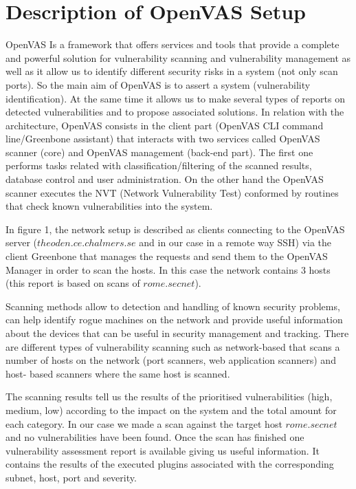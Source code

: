 \section{Description of OpenVAS Setup} \label{sec:setup}

OpenVAS Is a framework that offers services and tools that provide a complete and powerful solution for vulnerability scanning and vulnerability management as well as it allow us to identify different security risks in a system (not only scan ports). So the main aim of OpenVAS is to assert a system (vulnerability identification). At the same time it allows us to make several types of reports on detected vulnerabilities and to propose associated solutions. In relation with the architecture, OpenVAS consists in the client part (OpenVAS CLI command line/Greenbone assistant) that interacts with two services called OpenVAS scanner (core) and OpenVAS management (back-end part). The first one performs tasks related with classification/filtering of the scanned results, database control and user administration. On the other hand the OpenVAS scanner executes the NVT (Network Vulnerability Test) conformed by routines that check known vulnerabilities into the system.

In figure 1, the network setup is described as clients connecting to the OpenVAS server ($theoden.ce.chalmers.se$ and in our case in a remote way SSH) via the client Greenbone that manages the  requests and send them to the OpenVAS Manager in order to scan the hosts. In this case the network contains 3 hosts (this report is based on scans of $rome.secnet$).

Scanning methods allow to detection and handling of known security problems, can help identify rogue machines on the network and provide useful information about the 	devices that can be useful in security management and tracking.
There are different types of vulnerability scanning such as network-based that scans a 	number of hosts on the network (port scanners, web application scanners) and host-	based scanners where the same host is scanned.

The scanning results tell us the results of the prioritised vulnerabilities (high, 	medium, low) according to the impact on the system and the total amount for each category. In our case we made a scan against the target host $rome.secnet$ and no 	vulnerabilities have been found. Once the scan has finished one vulnerability 	assessment report is available giving us useful information. It contains the results of the executed plugins associated with the corresponding subnet, host, port and severity.

